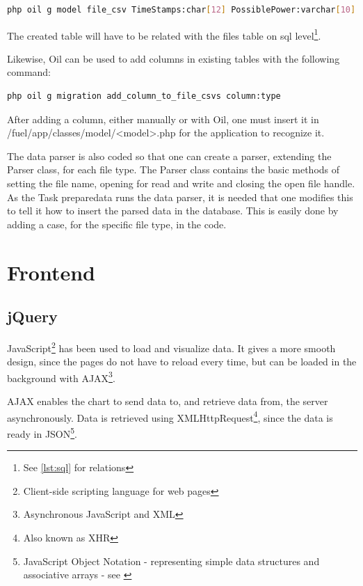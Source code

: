 \begin{lstlisting}[language=sh,caption={Oil command for creating model and migration},label={lst:oil_command}]
php oil g model file_csv TimeStamps:char[12] PossiblePower:varchar[10] WindSpeed:varchar[10] RegimePossible:varchar[10] OutputPower:varchar[10] RegimeOutput:varchar[10] TimeStampsR:char[19] file_id:bigint --no-timestamp
\end{lstlisting}

The created table will have to be related with the \textsf{files} table on sql level\footnote{See \ref{lst:sql} for relations}.

Likewise, \textsf{Oil} can be used to add columns in existing tables with the following command:
\begin{lstlisting}[language=sh]
php oil g migration add_column_to_file_csvs column:type
\end{lstlisting}

After adding a column, either manually or with \textsf{Oil}, one must insert it in \textsf{/fuel/app/classes/model/<model>.php} for the application to recognize it.

The data parser is also coded so that one can create a parser, extending the \textsf{Parser} class, for each file type. The \textsf{Parser} class contains the basic methods of setting the file name, opening for read and write and closing the open file handle. As the \textsf{Task preparedata} runs the data parser, it is needed that one modifies this to tell it how to insert the parsed data in the database. This is easily done by adding a \textsf{case}, for the specific file type, in the code.

\section{Frontend}
\label{sec:frontend}
\subsection{jQuery}
\label{sec:jquery}
JavaScript\footnote{Client-side scripting language for web pages} has been used to load and visualize data. It gives a more smooth design, since the pages do not have to reload every time, but can be loaded in the background with AJAX\footnote{Asynchronous JavaScript and XML}.
 
AJAX enables the chart to send data to, and retrieve data from, the server asynchronously. Data is retrieved using XMLHttpRequest\footnote{Also known as XHR}, since the data is ready in JSON\footnote{JavaScript Object Notation - representing simple data structures and associative arrays - see \cite{json}}.

